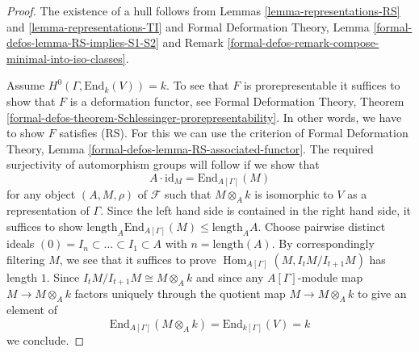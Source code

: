 \documentclass[10pt,a4paper]{amsart}
\theoremstyle{plain}
\theoremstyle{definition}
\theoremstyle{remark}
\numberwithin{equation}{subsection}
\def\Hom{\mathop{\mathrm{Hom}}\nolimits}
\begin{document}
\begin{proof}
The existence of a hull follows from Lemmas \ref{lemma-representations-RS} and
\ref{lemma-representations-TI} and
Formal Deformation Theory, Lemma \ref{formal-defos-lemma-RS-implies-S1-S2}
and Remark \ref{formal-defos-remark-compose-minimal-into-iso-classes}.

\medskip\noindent
Assume $H^0(\Gamma, \text{End}_k(V)) = k$. To see that $F$
is prorepresentable it suffices to show that $F$ is a
deformation functor, see Formal Deformation Theory, Theorem
\ref{formal-defos-theorem-Schlessinger-prorepresentability}.
In other words, we have to show $F$ satisfies (RS).
For this we can use the criterion of Formal Deformation Theory, Lemma
\ref{formal-defos-lemma-RS-associated-functor}.
The required surjectivity of automorphism groups will follow if we
show that
$$
A \cdot \text{id}_M =
\text{End}_{A[\Gamma]}(M)
$$
for any object $(A, M, \rho)$ of $\mathcal{F}$ such that
$M \otimes_A k$ is isomorphic to $V$ as a representation of $\Gamma$.
Since the left hand side is contained in the right hand side,
it suffices to show
$\text{length}_A \text{End}_{A[\Gamma]}(M) \leq \text{length}_A A$.
Choose pairwise distinct ideals
$(0) = I_n \subset \ldots \subset I_1 \subset A$
with $n = \text{length}(A)$. By correspondingly filtering
$M$, we see that it suffices to prove $\Hom_{A[\Gamma]}(M, I_tM/I_{t + 1}M)$
has length $1$. Since $I_tM/I_{t + 1}M \cong M \otimes_A k$
and since any $A[\Gamma]$-module map $M \to M \otimes_A k$ factors
uniquely through the quotient map $M \to M \otimes_A k$
to give an element of
$$
\text{End}_{A[\Gamma]}(M \otimes_A k) = \text{End}_{k[\Gamma]}(V) = k
$$
we conclude.
\end{proof}
\end{document}

